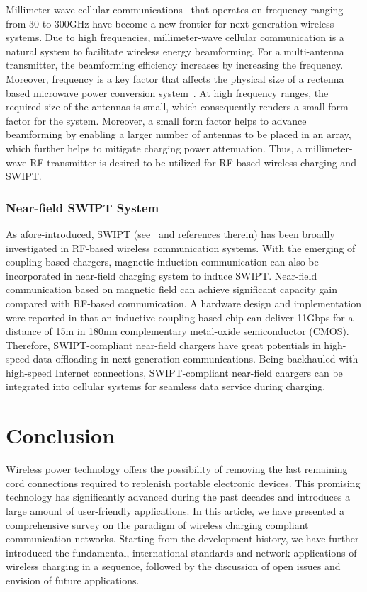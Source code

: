 \documentclass[twocolumn,10pt]{IEEEtran}
\begin{document}
 
Millimeter-wave cellular communications~\cite{S.2014Rangan} that operates on frequency ranging from 30 to 300GHz have become a new frontier for next-generation wireless systems. Due to high frequencies, millimeter-wave cellular communication is a natural system to facilitate wireless energy beamforming. For a multi-antenna transmitter, the beamforming efficiency increases by increasing the frequency. Moreover, frequency is a key factor that affects the physical size of a rectenna based microwave power conversion system~\cite{G.2008Chattopadhyay}. At high frequency ranges, the required size of the antennas is small, which consequently renders a small form factor for the system. Moreover, a small form factor helps to advance beamforming by enabling a larger number of antennas to be placed in an array, which further helps to mitigate charging power attenuation. Thus,  a millimeter-wave RF transmitter is desired to be utilized for RF-based wireless charging and SWIPT.   

 

\subsubsection{Near-field SWIPT System}
As afore-introduced, SWIPT (see~\cite{X.LuSurvey} and references therein) has been broadly investigated in RF-based wireless communication systems. With the emerging of coupling-based chargers, magnetic induction communication \cite{Z.July2010Sun} can also be incorporated in near-field charging system to induce SWIPT.  
Near-field communication based on magnetic field can achieve significant capacity gain compared with RF-based communication.
A hardware design and implementation were reported in \cite{N.2009Miura} that an inductive coupling based chip can deliver 11Gbps for a distance of 15m in 180nm complementary metal-oxide semiconductor (CMOS).
Therefore, SWIPT-compliant near-field chargers have great potentials in high-speed data offloading in next generation communications. Being backhauled with high-speed Internet connections,  SWIPT-compliant near-field chargers can be integrated into cellular systems for seamless data service during charging.    

 


\section{Conclusion}
 
Wireless power technology offers the possibility of removing the last remaining cord connections required to replenish portable electronic devices. This promising technology has significantly advanced during the past decades and introduces a large amount of user-friendly applications. In this article, we have presented a comprehensive survey on the paradigm of wireless charging compliant communication networks. Starting from the development history, we have further introduced the fundamental, international standards and network applications of wireless charging in a sequence, followed by the discussion of open issues and envision of future applications.  
\end{document}
